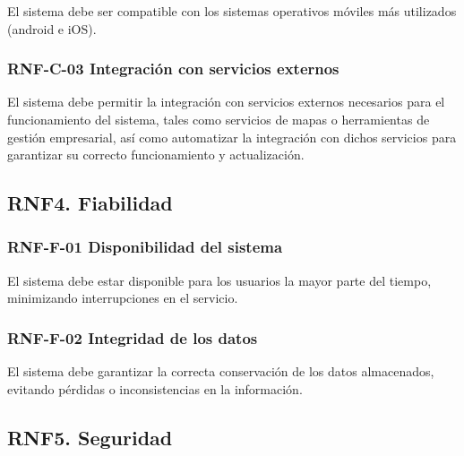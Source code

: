 El sistema debe ser compatible con los sistemas operativos móviles más utilizados (android e iOS).

\vspace{-0.75em}
\subsubsection{RNF-C-03 Integración con servicios externos}
\vspace{-1em}

El sistema debe permitir la integración con servicios externos necesarios para el funcionamiento del sistema, tales como servicios de mapas o herramientas de gestión empresarial, así como automatizar la integración con dichos servicios para garantizar su correcto funcionamiento y actualización.

\subsection{RNF4. Fiabilidad}

\vspace{-0.75em}
\subsubsection{RNF-F-01 Disponibilidad del sistema}
\vspace{-1em}

El sistema debe estar disponible para los usuarios la mayor parte del tiempo, minimizando interrupciones en el servicio.

\vspace{-0.75em}
\subsubsection{RNF-F-02 Integridad de los datos}
\vspace{-1em}

El sistema debe garantizar la correcta conservación de los datos almacenados, evitando pérdidas o inconsistencias en la información.

\subsection{RNF5. Seguridad}

